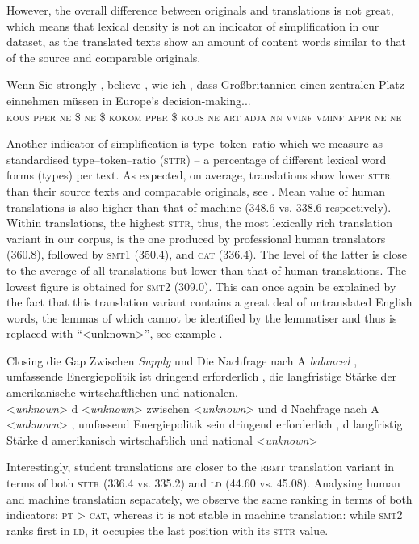 \documentclass[output=paper]{LSP/langsci}
\begin{document}
However, the overall difference between originals and translations is not great, which means that lexical density is not an indicator of simplification in our dataset, as the translated texts show an amount of content words similar to that of the source and comparable originals.

\ea \label{ex:4:1}
\gll Wenn Sie strongly , believe , wie ich , dass Großbritannien einen zentralen Platz einnehmen müssen in Europe’s decision-making...\\
\textsc{kous} \textsc{pper} \textsc{ne} \$ \textsc{ne} \$ \textsc{kokom} \textsc{pper} \$ \textsc{kous} \textsc{ne} \textsc{art} \textsc{adja} \textsc{nn} \textsc{vvinf} \textsc{vminf} \textsc{appr} \textsc{ne} \textsc{ne}\\
\z

Another indicator of simplification is type--token--ratio which we measure as standardised type--token--ratio (\textsc{sttr}) – a percentage of different lexical word forms (types) per text. As expected, on average, translations show lower \textsc{sttr} than their source texts and comparable originals, see . Mean value of human translations is also higher than that of machine (348.6 vs. 338.6 respectively). Within translations, the highest \textsc{sttr}, thus, the most lexically rich translation variant in our corpus, is the one produced by professional human translators (360.8), followed by \textsc{smt}1 (350.4), and \textsc{cat} (336.4).  The level of the latter is close to the average of all translations but lower than that of human translations. The lowest figure is obtained for \textsc{smt}2 (309.0). This can once again be explained by the fact that this translation variant contains a great deal of untranslated English words, the lemmas of which cannot be identified by the lemmatiser and thus is replaced with “<unknown>”, see example .

\ea \label{ex:4:2}
\gll Closing die Gap Zwischen \textit{Supply} und Die Nachfrage nach A \textit{balanced} , umfassende Energiepolitik ist dringend erforderlich , die langfristige Stärke der amerikanische wirtschaftlichen und nationalen.\\
<\textit{unknown}> d <\textit{unknown}> zwischen <\textit{unknown}> und d Nachfrage nach A <\textit{unknown}> , umfassend Energiepolitik sein dringend erforderlich , d langfristig Stärke d amerikanisch wirtschaftlich und {national <\textit{unknown}>}\\
\z

Interestingly, student translations are closer to the \textsc{rbmt} translation variant in terms of both \textsc{sttr} (336.4 vs. 335.2) and \textsc{ld} (44.60 vs. 45.08). Analysing human and machine translation separately, we observe the same ranking in terms of both indicators: \textsc{pt} > \textsc{cat}, whereas it is not stable in machine translation: while \textsc{smt}2 ranks first in \textsc{ld}, it occupies the last position with its \textsc{sttr} value.
\end{document}
